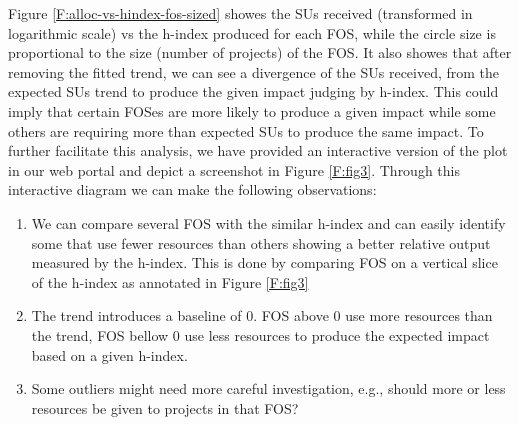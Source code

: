 \documentclass{sig-alternate}
\begin{document}
Figure \ref{F:alloc-vs-hindex-fos-sized} showes the SUs received (transformed in logarithmic scale) vs the h-index produced for each FOS, while the circle size is proportional to the size (number of projects) of the FOS. It also showes that after removing the fitted trend, we can see a divergence of the SUs received, from the expected SUs trend to produce the given impact judging by h-index. This could imply that certain FOSes are more likely to produce a given impact while some others are requiring more than expected SUs to produce the same impact. To further facilitate this analysis, we have provided an interactive version of the plot in our web portal and depict a screenshot in Figure \ref{F:fig3}. Through this interactive diagram we can make the following observations: 
 
\begin{enumerate} 
 
\item We can compare several FOS with the similar h-index and can easily identify some that use fewer resources than others showing a better relative output measured by the h-index. This is done by comparing FOS on a vertical slice of the h-index as annotated in Figure \ref{F:fig3} 
 
\item The trend introduces a baseline of 0. FOS above 0 use more resources than the trend, FOS bellow 0 use less resources to produce the expected impact based on a given h-index. 
 
\item Some outliers might need more careful investigation, e.g., should more or less resources be given to projects in that FOS? 
 
\end{enumerate} 
 
\end{document}
